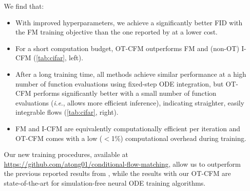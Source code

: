 \documentclass[10pt]{article}
\theoremstyle{plain}
\theoremstyle{definition}
\theoremstyle{remark}
\newcommand{\ie}{\textit{i.e.}}
\begin{document}
We find that:
\begin{itemize}[nosep,left=0pt]
\item With improved hyperparameters, we achieve a significantly better FID with the FM training objective than the one reported by \cite{lipman_flow_2022} at a lower cost.
\item For a short computation budget, OT-CFM outperforms FM and (non-OT) I-CFM (\autoref{tab:cifar}, left).
\item After a long training time, all methods achieve similar performance at a high number of function evaluations using fixed-step ODE integration, but OT-CFM performs significantly better with a small number of function evaluations (\ie, allows more efficient inference), indicating straighter, easily integrable flows (\autoref{tab:cifar}, right).
\item FM and I-CFM are equivalently computationally efficient per iteration and OT-CFM comes with a low ($<$1\%) computational overhead during training.
\end{itemize}

Our new training procedures, available at \url{https://github.com/atong01/conditional-flow-matching}, allow us to outperform the previous reported results from \cite{lipman_flow_2022}, while the results with our OT-CFM are state-of-the-art for simulation-free neural ODE training algorithms.
\end{document}
